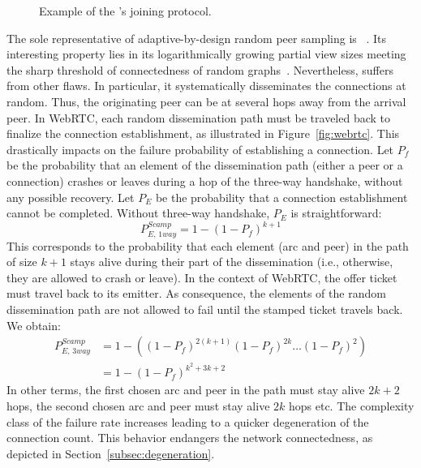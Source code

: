 \begin{figure*}
  \centering
  \hspace{8pt}
  \hspace{8pt}
  \caption{\label{fig:joiningexample}Example of the \SPRAY's joining
    protocol.}
\end{figure*}

The sole representative of adaptive-by-design random peer sampling is
\SCAMP~\cite{ganesh2001scamp,ganesh2003peer}. Its interesting property lies in
its logarithmically growing partial view sizes meeting the sharp threshold of
connectedness of random graphs~\cite{erdos1959random}. Nevertheless, \SCAMP
suffers from other flaws. In particular, it systematically disseminates the
connections at random. Thus, the originating peer can be at several hops away
from the arrival peer. In WebRTC, each random dissemination path must
be traveled back to finalize the connection establishment, as illustrated in
Figure~\ref{fig:webrtc}. This drastically impacts on the \SCAMP failure
probability of establishing a connection.  Let $P_f$ be the probability that an
element of the dissemination path (either a peer or a connection)
crashes or leaves during a hop of the three-way handshake, without any possible
recovery. Let $P_E$ be the probability that a connection establishment cannot
be completed. Without three-way handshake, $P_E$ is straightforward:
\begin{equation} P_{E,\,1way}^{Scamp}=1-(1- P_f)^{k+1} \end{equation} This
corresponds to the probability that each element (arc and peer) in the path of
size $k+1$ stays alive during their part of the dissemination (i.e., otherwise,
they are allowed to crash or leave). In the context of WebRTC, the offer ticket must
travel back to its emitter. As consequence, the elements of the random
dissemination path are not allowed to fail until the stamped ticket travels
back. We obtain:
\begin{align} P_{E,\,3way}^{Scamp} &=1 - ((1-P_f)^{2(k+1)} (1-P_f)^{2k}
                                     \ldots (1-P_f)^2) \nonumber \\
                                   &=1-(1-P_f)^{k^2+3k+2}
\end{align}
In other terms, the first chosen arc and peer in the path must stay alive
$2k+2$ hops, the second chosen arc and peer must stay alive $2k$ hops etc.  The
complexity class of the \SCAMP failure rate increases leading to a quicker
degeneration of the connection count. This behavior endangers the network
connectedness, as depicted in Section~\ref{subsec:degeneration}.

